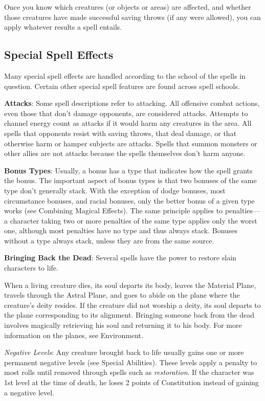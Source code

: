 				
Once you know which creatures (or objects or areas) are affected, and whether those creatures have made successful saving throws (if any were allowed), you can apply whatever results a spell entails.
				
\subsection{Special Spell Effects}

				
Many special spell effects are handled according to the school of the spells in question. Certain other special spell features are found across spell schools.
				
\textbf{Attacks}: Some spell descriptions refer to attacking. All offensive combat actions, even those that don't damage opponents, are considered attacks. Attempts to channel energy count as attacks if it would harm any creatures in the area. All spells that opponents resist with saving throws, that deal damage, or that otherwise harm or hamper subjects are attacks. Spells that summon monsters or other allies are not attacks because the spells themselves don't harm anyone.
				
\textbf{Bonus Types}: Usually, a bonus has a type that indicates how the spell grants the bonus. The important aspect of bonus types is that two bonuses of the same type don't generally stack. With the exception of dodge bonuses, most circumstance bonuses, and racial bonuses, only the better bonus of a given type works (see Combining Magical Effects). The same principle applies to penalties---a character taking two or more penalties of the same type applies only the worst one, although most penalties have no type and thus always stack. Bonuses without a type always stack, unless they are from the same source.
				
\textbf{Bringing Back the Dead}: Several spells have the power to restore slain characters to life.
				
When a living creature dies, its soul departs its body, leaves the Material Plane, travels through the Astral Plane, and goes to abide on the plane where the creature's deity resides. If the creature did not worship a deity, its soul departs to the plane corresponding to its alignment. Bringing someone back from the dead involves magically retrieving his soul and returning it to his body. For more information on the planes, see Environment.
				
\textit{Negative Levels}: Any creature brought back to life usually gains one or more permanent negative levels (see Special Abilities). These levels apply a penalty to most rolls until removed through spells such as \textit{restoration}. If the character was 1st level at the time of death, he loses 2 points of Constitution instead of gaining a negative level.
				
